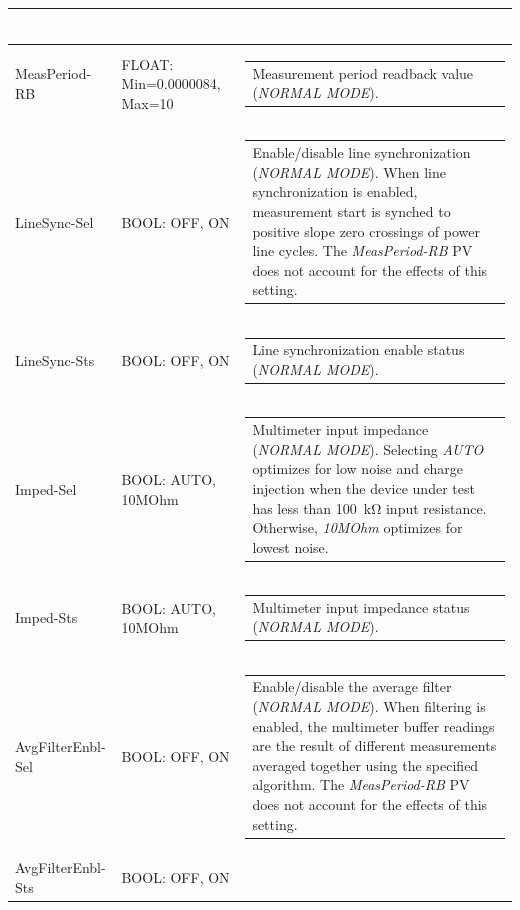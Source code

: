 \documentclass[openany]{article}
\begin{document}
\begin{longtable}{| m{3.0cm} m{4.5cm} m{7.0cm} |}
\begin{tabular}{@{}m{6cm}@{}}
						\end{tabular} \\ \hline
		MeasPeriod-RB & FLOAT: Min=0.0000084, Max=10 & \begin{tabular}{@{}m{6cm}@{}}
	    					Measurement period readback value (\emph{NORMAL MODE}).
						\end{tabular} \\ \hline
		LineSync-Sel & BOOL: OFF, ON & \begin{tabular}{@{}m{6cm}@{}}
	    					Enable/disable line synchronization (\emph{NORMAL MODE}). When line synchronization is enabled, measurement start is synched to positive slope zero crossings of power line cycles. The \emph{MeasPeriod-RB} PV does not account for the effects of this setting.
						\end{tabular} \\ \hline
		LineSync-Sts & BOOL: OFF, ON & \begin{tabular}{@{}m{6cm}@{}}
	    					Line synchronization enable status (\emph{NORMAL MODE}).
						\end{tabular} \\ \hline
		Imped-Sel & BOOL: AUTO, 10MOhm & \begin{tabular}{@{}m{6cm}@{}}
	    					Multimeter input impedance (\emph{NORMAL MODE}). Selecting \emph{AUTO} optimizes for low noise and charge injection when the device under test has less than \SI{100}{\kohm} input resistance. Otherwise, \emph{10MOhm} optimizes for lowest noise.
						\end{tabular} \\ \hline
		Imped-Sts & BOOL: AUTO, 10MOhm & \begin{tabular}{@{}m{6cm}@{}}
	    					Multimeter input impedance status (\emph{NORMAL MODE}).
						\end{tabular} \\ \hline
		AvgFilterEnbl-Sel & BOOL: OFF, ON & \begin{tabular}{@{}m{6cm}@{}}
	    					Enable/disable the average filter (\emph{NORMAL MODE}). When filtering is enabled, the multimeter buffer readings are the result of different measurements averaged together using the specified algorithm. The \emph{MeasPeriod-RB} PV does not account for the effects of this setting.
						\end{tabular} \\ \hline
		AvgFilterEnbl-Sts & BOOL: OFF, ON & \begin{tabular}{@{}m{6cm}@{}}

\end{tabular}
\end{longtable}
\end{document}
